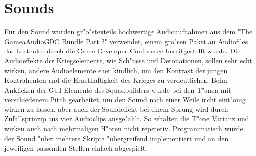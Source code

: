\chapter{Sounds}

Für den Sound  wurden gr"o"stenteils hochwertige Audioaufnahmen aus dem "The GameaAudioGDC Bundle Part 2" verwendet, einem gro"sen Paket an Audiofiles das kostenlos durch die Game Developer Conforence bereitgestellt wurde.
Die Audioeffekte der Kriegselemente, wie Sch"usse und Detonationen, sollen sehr echt wirken, andere Audioelemente eher kindlich, um den Kontrast der jungen Kontrahenten und die Ernsthaftigkeit des Krieges zu verdeutlichen.
Beim Anklicken der GUI-Elemente des Squadbuilders wurde bei den T"onen mit verschiedenem Pitch gearbeitet, um den Sound nach einer Weile nicht eint"onig wirken zu lassen, aber auch der Soundeffekt bei einem Sprung wird durch Zufallsprinzip aus vier Audioclips ausge"ahlt. So erhalten die T"one Varianz und wirken auch nach mehrmaligen H"oren nicht repetetiv.
Programmatisch wurde der Sound "uber mehrere Skripte "ubergreifend implementiert und an den jeweiligen passenden Stellen einfach abgespielt.
